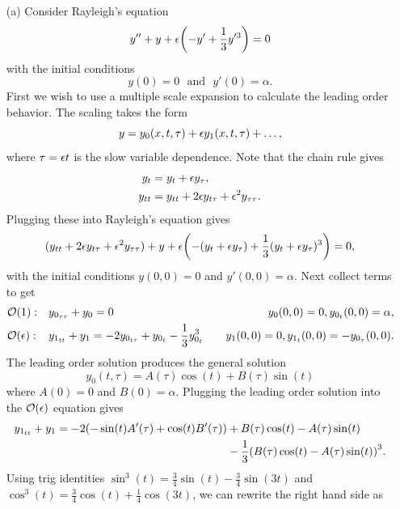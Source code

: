 \documentclass[12pt]{report}
\begin{document}
\begin{solution}
    
    \noindent
    \begin{enumerate}
        \def\w{\omega}



        \item [(a)]
        Consider Rayleigh's equation
        \[ 
            y'' + y + {\epsilon} {\left(-y' + \frac{1}{3}y'^3 \right)} = 0
        \]
        with the initial conditions
        \[ 
            y(0) = 0 ~~~ \text{and} ~~~ y'(0) = \alpha. 
        \]
        First we wish to use a multiple scale expansion to calculate the leading order behavior. The scaling takes the form
        \[ 
            y = y_0(x,t,\tau) + {\epsilon} y_1(x,t,\tau) + \dots, 
        \]
        where $\tau = {\epsilon} t$ is the slow variable dependence. Note that the chain rule gives 
        \begin{align*}
            y_{t} &= y_{t} + {\epsilon} y_{\tau},\\
            y_{tt} &= y_{tt} + 2{\epsilon} y_{t\tau} + {\epsilon}^2y_{\tau \tau}.
        \end{align*}
        Plugging these into Rayleigh's equation gives
        \[ 
            (y_{tt} + 2{\epsilon} y_{t\tau} + {\epsilon}^2y_{\tau \tau}) + y + {\epsilon}{\left(-( y_{t} + {\epsilon} y_{\tau}) + \frac{1}{3}( y_{t} + {\epsilon} y_{\tau})^3\right)} = 0,
        \]
        with the initial conditions $y(0,0) = 0$ and $y'(0,0) = \alpha$. Next collect terms to get
        \begin{align*}
            &{\mathcal{O}}(1): &&y_{0_{\tau \tau}} + y_0 = 0 &&&y_0(0,0) = 0,y_{0_t}(0,0) = \alpha,\\
            &{\mathcal{O}}({\epsilon}): &&y_{1_{tt}} + y_1 = - 2y_{0_{t\tau}} + y_{0_t} - \frac{1}{3}y_{0_t}^3 &&&y_1(0,0)=0, y_{1_t}(0,0) = -y_{0_\tau}(0,0).
        \end{align*}  
        The leading order solution produces the general solution
        \[ 
            y_0(t,\tau) = A(\tau)\cos(t) + B(\tau)\sin(t)
        \]
        where $A(0) = 0$ and $B(0) = \alpha$. Plugging the leading order solution into the ${\mathcal{O}}({\epsilon})$ equation gives
        \begin{align*}
            y_{1_{tt}} + y_1 = -2(-\sin(t)A'(\tau) + \cos(t)B'(\tau)) &+ B(\tau)\cos(t) - A(\tau)\sin(t)\\ 
            &- \frac{1}{3} {\left(B(\tau)\cos(t)- A(\tau)\sin(t)\right)}^3.
        \end{align*} 
        Using trig identities $\sin^3(t) = \frac{3}{4}\sin(t) - \frac{3}{4}\sin(3t)$ and $\cos^3(t) = \frac{3}{4}\cos(t) + \frac{1}{4}\cos(3t)$, we can rewrite the right hand side as

\end{enumerate}
\end{solution}
\end{document}
